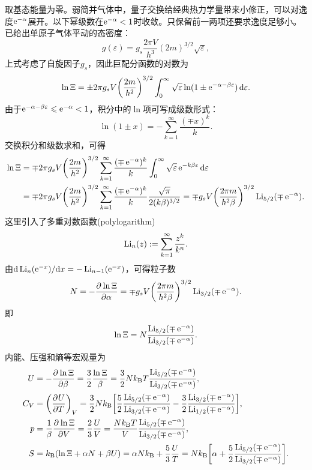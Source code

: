 取基态能量为零。弱简并气体中，量子交换给经典热力学量带来小修正，可以对逸度$\mathop{}\!\mathrm{e}^{-\alpha}$展开。以下幂级数在$\mathop{}\!\mathrm{e}^{-\alpha} < 1$时收敛。只保留前一两项还要求逸度足够小。
 已给出单原子气体平动的态密度：
\begin{equation}
	\label{eq:sm-spin-resolved-density-of-states}
	g(\varepsilon) = g_s\frac{2\pi V}{h^3}(2m)^{3/2}\sqrt\varepsilon,
\end{equation}
上式考虑了自旋因子$g_s$，因此巨配分函数的对数为
\[
	\ln\Xi = \pm2\pi g_sV\biggl(\frac{2m}{h^2}\biggr)^{3/2}\int_0^\infty\sqrt\varepsilon\ln(1 \pm \mathop{}\!\mathrm{e}^{-\alpha-\beta\varepsilon})\mathop{}\!\mathrm{d}\varepsilon.
\]
由于$\mathop{}\!\mathrm{e}^{-\alpha-\beta\varepsilon} \leqslant \mathop{}\!\mathrm{e}^{-\alpha} < 1$，积分中的$\ln$项可写成级数形式：
\[
	\ln(1 \pm x) = -\sum_{k=1}^\infty\frac{(\mp x)^k}k.
\]
交换积分和级数求和，可得
\begin{align*}
	\ln\Xi
	&= \mp2\pi g_sV\biggl(\frac{2m}{h^2}\biggr)^{3/2}\sum_{k=1}^\infty\frac{(\mp\mathop{}\!\mathrm{e}^{-\alpha})^k}{k}\int_0^\infty\sqrt\varepsilon\mathop{}\!\mathrm{e}^{-k\beta\varepsilon}\mathop{}\!\mathrm{d}\varepsilon\\
	&= \mp2\pi g_sV\biggl(\frac{2m}{h^2}\biggr)^{3/2}\sum_{k=1}^\infty\frac{(\mp\mathop{}\!\mathrm{e}^{-\alpha})^k}{k}\frac{\sqrt\pi}{2(k\beta)^{3/2}}
	= \mp g_sV\biggl(\frac{2\pi m}{h^2\beta}\biggr)^{3/2}\operatorname{Li}_{5/2}(\mp\mathop{}\!\mathrm{e}^{-\alpha}).
\end{align*}
这里引入了多重对数函数(polylogarithm)
\begin{equation}
	\operatorname{Li}_n(z) := \sum_{k=1}^\infty\frac{z^k}{k^n}.
\end{equation}
由$\mathop{}\!\mathrm{d}\operatorname{Li}_n(\mathop{}\!\mathrm{e}^{-x})/\mathrm{d} x = -\operatorname{Li}_{n-1}(\mathop{}\!\mathrm{e}^{-x})$，可得粒子数
\begin{equation}
	\label{eq:sm-quantum-gas-number}
	N = -\frac{\partial^{}\ln\Xi}{\partial{\alpha}^{}} = \mp g_sV\biggl(\frac{2\pi m}{h^2\beta}\biggr)^{3/2}\operatorname{Li}_{3/2}(\mp\mathop{}\!\mathrm{e}^{-\alpha}).
\end{equation}
即
\[
	\ln\Xi = N\frac{\operatorname{Li}_{5/2}(\mp\mathop{}\!\mathrm{e}^{-\alpha})}{\operatorname{Li}_{3/2}(\mp\mathop{}\!\mathrm{e}^{-\alpha})}.
\]
内能、压强和熵等宏观量为
\begin{subequations}
	\begin{align}
		U &= -\pv{\ln\Xi}\beta = \frac32\frac{\ln\Xi}\beta = \frac32N\kB T\frac{\Li_{5/2}(\mp\e^{-\alpha})}{\Li_{3/2}(\mp\e^{-\alpha})},\\
		C_V &= \pvat{U}{T}{V} = \frac32N\kB\biggb{\frac{5}2\frac{\Li_{5/2}(\mp\e^{-\alpha})}{\Li_{3/2}(\mp\e^{-\alpha})} - \frac32\frac{\Li_{3/2}(\mp\e^{-\alpha})}{\Li_{1/2}(\mp\e^{-\alpha})}},\\
		p &= \frac1\beta\pv{\ln\Xi}V = \frac23\frac UV = \frac{N\kB T}V\frac{\Li_{5/2}(\mp\e^{-\alpha})}{\Li_{3/2}(\mp\e^{-\alpha})},\\
		S &= \kB(\ln\Xi + \alpha N + \beta U) = \alpha N\kB + \frac53\frac UT = N\kB\biggb{\alpha + \frac52\frac{\Li_{5/2}(\mp\e^{-\alpha})}{\Li_{3/2}(\mp\e^{-\alpha})}}.
	\end{align}
\end{subequations}
